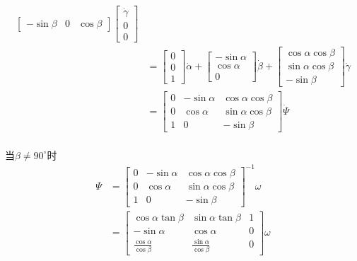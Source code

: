 \documentclass[UTF8, 13pt]{ctexart}
\begin{document}
\[\begin{aligned}
\begin{bmatrix}
            -\sin\beta & 0 & \cos\beta
        \end{bmatrix}
        \begin{bmatrix}
            \dot{\gamma} \\
            0 \\
            0 
        \end{bmatrix} \\
    &= \begin{bmatrix}
        0 \\
        0 \\
        1
        \end{bmatrix} \dot{\alpha}
        + \begin{bmatrix}
            -\sin\alpha \\
            \cos\alpha \\
            0
        \end{bmatrix} \dot{\beta}
        + \begin{bmatrix}
            \cos\alpha \cos\beta \\
            \sin\alpha \cos\beta \\
            -\sin\beta
        \end{bmatrix} \dot{\gamma} \\
    &= \begin{bmatrix}
        0 & -\sin\alpha & \cos\alpha \cos\beta \\
        0 & \cos\alpha & \sin\alpha \cos\beta \\
        1 & 0 & -\sin\beta
        \end{bmatrix} \dot{\Psi} \\
\end{aligned}
\]

当\(\beta \neq 90^\circ\)时
\[
\begin{aligned}
    \Psi &= \begin{bmatrix}
        0 & -\sin\alpha & \cos\alpha \cos\beta \\
        0 & \cos\alpha & \sin\alpha \cos\beta \\
        1 & 0 & -\sin\beta
        \end{bmatrix}^{-1} \omega \\
    &= \begin{bmatrix}
            \cos\alpha \tan\beta & \sin\alpha \tan\beta & 1 \\
            -\sin\alpha & \cos\alpha & 0 \\
            \frac{\cos\alpha}{\cos\beta} & \frac{\sin\alpha}{\cos\beta} & 0
        \end{bmatrix} \omega \\
\end{aligned}
\]
\end{document}
